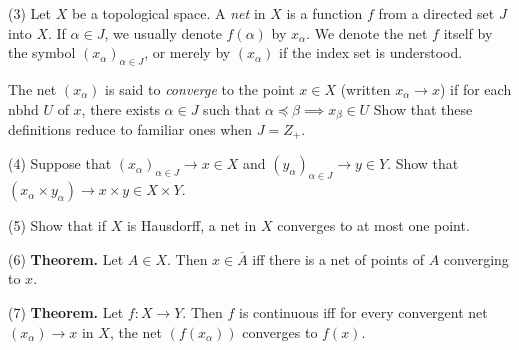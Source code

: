 \documentclass[a4paper]{article}
\begin{document}
(3) Let $X$ be a topological space. A \emph{net} in $X$ is a function $f$ from a directed set $J$ into $X$. If $\alpha \in J$, we usually denote $f(\alpha)$ by $x_\alpha$. We denote the net $f$ itself by the symbol $(x_\alpha)_{\alpha \in J}$, or merely by $(x_\alpha)$ if the index set is understood.

The net $(x_\alpha)$ is said to \emph{converge} to the point $x \in X$ (written $x_\alpha \to x$) if for each nbhd $U$ of $x$, there exists $\alpha \in J$ such that $\alpha \preceq \beta \implies x_\beta \in U$ Show that these definitions reduce to familiar ones when $J = Z_+$.

(4) Suppose that $(x_\alpha)_{\alpha \in J} \to x \in X$ and $(y_\alpha)_{\alpha \in J} \to y \in Y$. Show that $(x_\alpha \times y_\alpha) \to x \times y \in X \times Y$.

(5) Show that if $X$ is Hausdorff, a net in $X$ converges to at most one point.

(6) \textbf{Theorem.} Let $A \in X$. Then $x \in \overline{A}$ iff there is a net of points of $A$ converging to $x$.

(7) \textbf{Theorem.} Let $f : X \to Y$. Then $f$ is continuous iff for every convergent net $(x_\alpha) \to x$ in $X$, the net $(f(x_\alpha))$ converges to $f(x)$.
\end{document}
